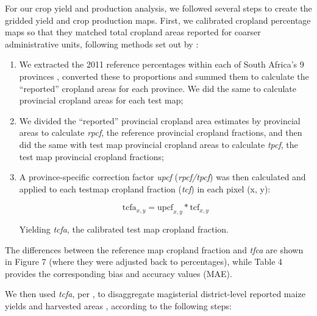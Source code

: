 \documentclass[11pt, titlepage]{article}
\begin{document}
For our crop yield and production analysis, we followed several steps to create the gridded yield and crop production maps. First, we calibrated cropland percentage maps so that they matched total cropland areas reported for coarser administrative units, following methods set out by \citet{ramankutty_farming_2008}: 

\begin{enumerate}
 \item We extracted the 2011 reference percentages within each of South Africa's 9 provinces \citep[the same units used by][]{ramankutty_farming_2008}, converted these to proportions and summed them to calculate the ``reported'' cropland areas for each province. We did the same to calculate provincial cropland areas for each test map;  
  \item We divided the ``reported'' provincial cropland area estimates by provincial areas to calculate \emph{rpcf}, the reference provincial cropland fractions, and then did the same with test map provincial cropland areas to calculate \emph{tpcf}, the test map provincial cropland fractions; 
  \item A province-specific correction factor \emph{upcf} (\emph{rpcf/tpcf}) was then calculated and applied to each testmap cropland fraction (\emph{tcf}) in each pixel (x, y):

  \begin{equation}  
    \textrm{tcfa}_{x,y} = \textrm{upcf}_{x,y} * \textrm{tcf}_{x,y}
  \end{equation}

Yielding \emph{tcfa}, the calibrated test map cropland fraction.  
\end{enumerate}

The differences between the reference map cropland fraction and \emph{tfca} are shown in Figure 7 (where they were adjusted back to percentages), while Table 4 provides the corresponding bias and accuracy values (MAE).

We then used \emph{tcfa}, per \citet{monfreda_farming_2008}, to disaggregate magisterial district-level reported maize yields and harvested areas \citep{statistics_south_africa_commercial_2007}, according to the following steps: 
\end{document}
